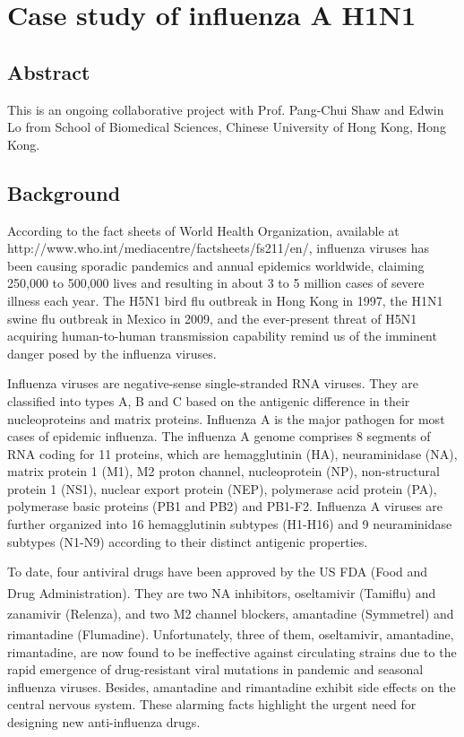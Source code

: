 \chapter{Case study of influenza A H1N1}

\section{Abstract}

This is an ongoing collaborative project with Prof. Pang-Chui Shaw and Edwin Lo from School of Biomedical Sciences, Chinese University of Hong Kong, Hong Kong.

\section{Background}

According to the fact sheets of World Health Organization, available at http://www.who.int/mediacentre/factsheets/fs211/en/, influenza viruses has been causing sporadic pandemics and annual epidemics worldwide, claiming 250,000 to 500,000 lives and resulting in about 3 to 5 million cases of severe illness each year. The H5N1 bird flu outbreak in Hong Kong in 1997, the H1N1 swine flu outbreak in Mexico in 2009, and the ever-present threat of H5N1 acquiring human-to-human transmission capability remind us of the imminent danger posed by the influenza viruses. 

Influenza viruses are negative-sense single-stranded RNA viruses. They are classified into types A, B and C based on the antigenic difference in their nucleoproteins and matrix proteins. Influenza A is the major pathogen for most cases of epidemic influenza. The influenza A genome comprises 8 segments of RNA coding for 11 proteins, which are hemagglutinin (HA), neuraminidase (NA), matrix protein 1 (M1), M2 proton channel, nucleoprotein (NP), non-structural protein 1 (NS1), nuclear export protein (NEP), polymerase acid protein (PA), polymerase basic proteins (PB1 and PB2) and PB1-F2. Influenza A viruses are further organized into 16 hemagglutinin subtypes (H1-H16) and 9 neuraminidase subtypes (N1-N9) according to their distinct antigenic properties.

To date, four antiviral drugs have been approved by the US FDA (Food and Drug Administration). They are two NA inhibitors, oseltamivir (Tamiflu\textsuperscript{\textregistered}) and zanamivir (Relenza\textsuperscript{\textregistered}), and two M2 channel blockers, amantadine (Symmetrel\textsuperscript{\textregistered}) and rimantadine (Flumadine\textsuperscript{\textregistered}). Unfortunately, three of them, oseltamivir, amantadine, rimantadine, are now found to be ineffective against circulating strains due to the rapid emergence of drug-resistant viral mutations in pandemic and seasonal influenza viruses. Besides, amantadine and rimantadine exhibit side effects on the central nervous system. These alarming facts highlight the urgent need for designing new anti-influenza drugs.

